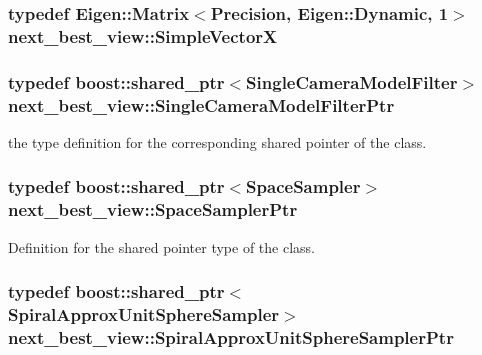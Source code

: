 \hypertarget{namespacenext__best__view_a1b2e77aebfe02c317fdae78c64312df9}{
\subsubsection[{\-Simple\-Vector\-X}]{\setlength{\rightskip}{0pt plus 5cm}typedef \-Eigen\-::\-Matrix$<${\bf \-Precision}, \-Eigen\-::\-Dynamic, 1$>$ {\bf next\-\_\-best\-\_\-view\-::\-Simple\-Vector\-X}}}\label{namespacenext__best__view_a1b2e77aebfe02c317fdae78c64312df9}
\hypertarget{namespacenext__best__view_a5abe7f8b4a8bdb1bdaf55043e4de9a64}{
\subsubsection[{\-Single\-Camera\-Model\-Filter\-Ptr}]{\setlength{\rightskip}{0pt plus 5cm}typedef boost\-::shared\-\_\-ptr$<${\bf \-Single\-Camera\-Model\-Filter}$>$ {\bf next\-\_\-best\-\_\-view\-::\-Single\-Camera\-Model\-Filter\-Ptr}}}\label{namespacenext__best__view_a5abe7f8b4a8bdb1bdaf55043e4de9a64}


the type definition for the corresponding shared pointer of the class. 

\hypertarget{namespacenext__best__view_af3d0f8204bad3e34940c86ba619815cc}{
\subsubsection[{\-Space\-Sampler\-Ptr}]{\setlength{\rightskip}{0pt plus 5cm}typedef boost\-::shared\-\_\-ptr$<${\bf \-Space\-Sampler}$>$ {\bf next\-\_\-best\-\_\-view\-::\-Space\-Sampler\-Ptr}}}\label{namespacenext__best__view_af3d0f8204bad3e34940c86ba619815cc}


\-Definition for the shared pointer type of the class. 

\hypertarget{namespacenext__best__view_a76b551eaed77a9e4b0a7e2b73c07458b}{
\subsubsection[{\-Spiral\-Approx\-Unit\-Sphere\-Sampler\-Ptr}]{\setlength{\rightskip}{0pt plus 5cm}typedef boost\-::shared\-\_\-ptr$<${\bf \-Spiral\-Approx\-Unit\-Sphere\-Sampler}$>$ {\bf next\-\_\-best\-\_\-view\-::\-Spiral\-Approx\-Unit\-Sphere\-Sampler\-Ptr}}}\label{namespacenext__best__view_a76b551eaed77a9e4b0a7e2b73c07458b}


